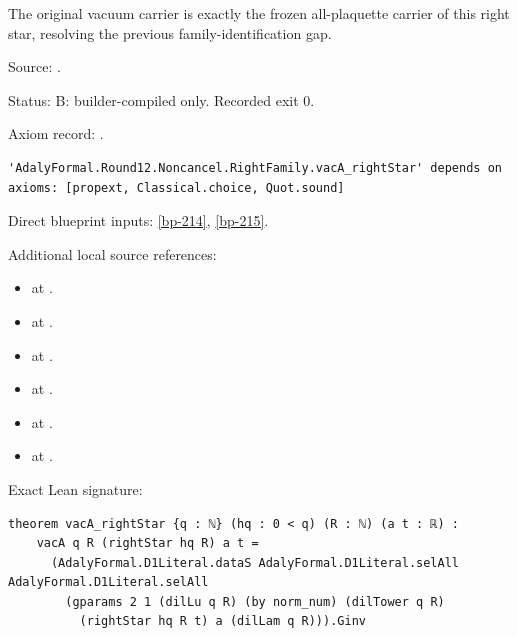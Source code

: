 \begin{theorem}[bp-216]
\label{bp-216}
\leanok
The original vacuum carrier is exactly the frozen all-plaquette carrier of this right star, resolving the previous family-identification gap.

\par Source: \texttt{}.
\par Status: B: builder-compiled only. Recorded exit 0.
\par Axiom record: \texttt{}.
\begin{verbatim}
'AdalyFormal.Round12.Noncancel.RightFamily.vacA_rightStar' depends on axioms: [propext, Classical.choice, Quot.sound]
\end{verbatim}
\par Direct blueprint inputs: \ref{bp-214}, \ref{bp-215}.
\par Additional local source references:
\begin{itemize}
\item \texttt{} at \texttt{}.
\item \texttt{} at \texttt{}.
\item \texttt{} at \texttt{}.
\item \texttt{} at \texttt{}.
\item \texttt{} at \texttt{}.
\item \texttt{} at \texttt{}.
\end{itemize}
\par Exact Lean signature:
\begin{verbatim}
theorem vacA_rightStar {q : ℕ} (hq : 0 < q) (R : ℕ) (a t : ℝ) :
    vacA q R (rightStar hq R) a t =
      (AdalyFormal.D1Literal.dataS AdalyFormal.D1Literal.selAll AdalyFormal.D1Literal.selAll
        (gparams 2 1 (dilLu q R) (by norm_num) (dilTower q R)
          (rightStar hq R t) a (dilLam q R))).Ginv
\end{verbatim}
\end{theorem}

